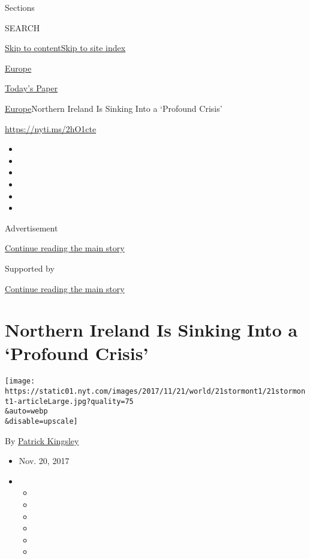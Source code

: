 Sections

SEARCH

\protect\hyperlink{site-content}{Skip to
content}\protect\hyperlink{site-index}{Skip to site index}

\href{https://www.nytimes.com/section/world/europe}{Europe}

\href{https://myaccount.nytimes.com/auth/login?response_type=cookie\&client_id=vi}{}

\href{https://www.nytimes.com/section/todayspaper}{Today's Paper}

\href{/section/world/europe}{Europe}\textbar{}Northern Ireland Is
Sinking Into a `Profound Crisis'

\url{https://nyti.ms/2hO1cte}

\begin{itemize}
\item
\item
\item
\item
\item
\item
\end{itemize}

Advertisement

\protect\hyperlink{after-top}{Continue reading the main story}

Supported by

\protect\hyperlink{after-sponsor}{Continue reading the main story}

\hypertarget{northern-ireland-is-sinking-into-a-profound-crisis}{%
\section{Northern Ireland Is Sinking Into a `Profound
Crisis'}\label{northern-ireland-is-sinking-into-a-profound-crisis}}

\texttt{[image: https://static01.nyt.com/images/2017/11/21/world/21stormont1/21stormont1-articleLarge.jpg?quality=75\\\&auto=webp\\\&disable=upscale]}

By \href{https://www.nytimes.com/by/patrick-kingsley}{Patrick Kingsley}

\begin{itemize}
\item
  Nov. 20, 2017
\item
  \begin{itemize}
  \item
  \item
  \item
  \item
  \item
  \item
  \end{itemize}
\end{itemize}

